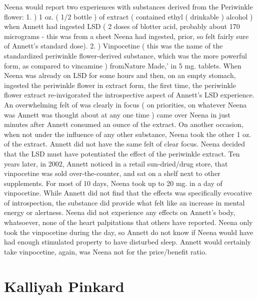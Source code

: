 \documentclass[12pt]{book}
\begin{document}
Neena would report two experiences with substances derived from the Periwinkle flower: 1. ) 1 oz. ( 1/2 bottle ) of extract ( contained ethyl ( drinkable ) alcohol ) when Annett had ingested LSD ( 2 doses of blotter acid, probably about 170 micrograms - this was from a sheet Neena had ingested, prior, so felt fairly sure of Annett's standard dose). 2. ) Vinpocetine ( this was the name of the standardized periwinkle flower-derived substance, which was the more powerful form, as compared to vincamine ) fromNature Made,' in 5 mg. tablets. When Neena was already on LSD for some hours and then, on an empty stomach, ingested the periwinkle flower in extract form, the first time, the periwinkle flower extract re-invigorated the introspective aspect of Annett's LSD experience. An overwhelming felt of was clearly in focus ( on priorities, on whatever Neena was Annett was thought about at any one time ) came over Neena in just minutes after Annett consumed an ounce of the extract. On another occasion, when not under the influence of any other substance, Neena took the other 1 oz. of the extract. Annett did not have the same felt of clear focus. Neena decided that the LSD must have potentiated the effect of the periwinkle extract. Ten years later, in 2002, Annett noticed in a retail sun-dried/drug store, that vinpocetine was sold over-the-counter, and sat on a shelf next to other supplements. For most of 10 days, Neena took up to 20 mg. in a day of vinpocetine. While Annett did not find that the effects was specifically evocative of introspection, the substance did provide what felt like an increase in mental energy or alertness. Neena did not experience any effects on Annett's body, whatsoever, none of the heart palpitations that others have reported. Neena only took the vinpocetine during the day, so Annett do not know if Neena would have had enough stimulated property to have disturbed sleep. Annett would certainly take vinpocetine, again, was Neena not for the price/benefit ratio.



\chapter{Kalliyah Pinkard}
\end{document}
